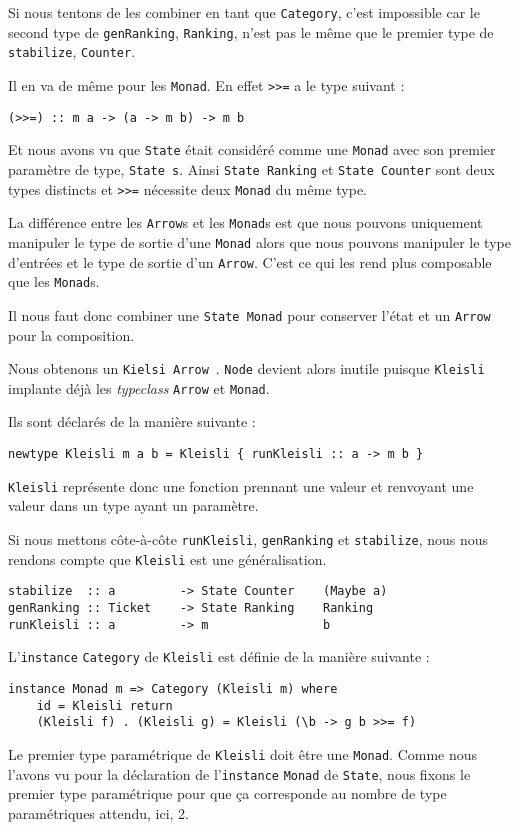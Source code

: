 \documentclass{llncs}
\newcommand{\Arr}{\lstinline{Arrow} }
\newcommand{\Arrp}{\lstinline{Arrow}. }
\newcommand{\Arrs}{\lstinline{Arrow}s }
\begin{document}
Si nous tentons de les combiner en tant que \lstinline{Category}, c'est impossible
car le second type de \lstinline{genRanking}, \lstinline{Ranking}, n'est pas le
même que le premier type de \lstinline{stabilize}, \lstinline{Counter}.

Il en va de même pour les \lstinline{Monad}.
En effet \lstinline{>>=} a le type suivant :
\begin{lstlisting}
(>>=) :: m a -> (a -> m b) -> m b
\end{lstlisting}

Et nous avons vu que \lstinline{State} était considéré comme une \lstinline{Monad}
avec son premier paramètre de type, \lstinline{State s}.
Ainsi \lstinline{State Ranking} et \lstinline{State Counter} sont deux types distincts
et \lstinline{>>=} nécessite deux \lstinline{Monad} du même type.

La différence entre les \Arrs et les \lstinline{Monad}s est que nous pouvons
uniquement manipuler le type de sortie d'une \lstinline{Monad} alors que nous pouvons
manipuler le type d'entrées et le type de sortie d'un \Arrp
C'est ce qui les rend plus composable que les \lstinline{Monad}s.

Il nous faut donc combiner une \lstinline{State Monad} pour conserver l'état et un
\lstinline{Arrow} pour la composition.

Nous obtenons un \lstinline{Kielsi Arrow}~\cite{Hughes00}.
\lstinline{Node} devient alors inutile puisque \lstinline{Kleisli} implante déjà les
\emph{typeclass} \Arr et \lstinline{Monad}.

Ils sont déclarés de la manière suivante :
\begin{lstlisting}
newtype Kleisli m a b = Kleisli { runKleisli :: a -> m b }
\end{lstlisting}

\lstinline{Kleisli} représente donc une fonction prennant une valeur et renvoyant
une valeur dans un type ayant un paramètre.

Si nous mettons côte-à-côte \lstinline{runKleisli}, \lstinline{genRanking} et
\lstinline{stabilize}, nous nous rendons compte que \lstinline{Kleisli} est une
généralisation.
\begin{lstlisting}
stabilize  :: a         -> State Counter    (Maybe a)
genRanking :: Ticket    -> State Ranking    Ranking
runKleisli :: a         -> m                b
\end{lstlisting}

L'\lstinline{instance} \lstinline{Category} de \lstinline{Kleisli} est
définie de la manière suivante :
\begin{lstlisting}
instance Monad m => Category (Kleisli m) where
    id = Kleisli return
    (Kleisli f) . (Kleisli g) = Kleisli (\b -> g b >>= f)
\end{lstlisting}
Le premier type paramétrique de \lstinline{Kleisli} doit être une \lstinline{Monad}.
Comme nous l'avons vu pour la déclaration de l'\lstinline{instance} \lstinline{Monad}
de \lstinline{State}, nous fixons le premier type paramétrique pour que ça corresponde
au nombre de type paramétriques attendu, ici, 2.
\end{document}
